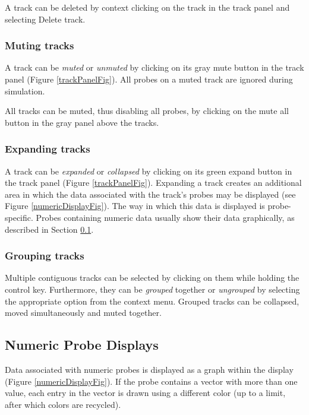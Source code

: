 \documentclass{article}
\begin{document}
A track can be deleted by context clicking on the track in
the track panel and selecting {\sf Delete track}.

\subsubsection{Muting tracks}

A track can be {\it muted} or {\it unmuted} by clicking on its gray mute button
in the track panel (Figure \ref{trackPanelFig}). All probes on a muted track are
ignored during simulation.

All tracks can be muted, thus disabling all probes, by clicking
on the mute all button in the gray panel above the tracks.

\subsubsection{Expanding tracks}

A track can be {\it expanded} or {\it collapsed} by clicking on its green
expand button in the track panel (Figure \ref{trackPanelFig}). Expanding a track
creates an additional area in which the data associated with the
track's probes may be displayed (see Figure \ref{numericDisplayFig}). The way
in which this data is displayed is probe-specific. Probes containing
numeric data usually show their data graphically, as described in
Section \ref{numericProbeDisplaysSec}.

\subsubsection{Grouping tracks}

Multiple contiguous tracks can be selected by clicking on them while
holding the control key.  Furthermore, they can be {\it grouped} together
or {\it ungrouped} by selecting the appropriate option from the context
menu.  Grouped tracks can be collapsed, moved simultaneously and
muted together.

\subsection{Numeric Probe Displays}
\label{numericProbeDisplaysSec}

Data associated with numeric probes is displayed as a graph within the
display (Figure \ref{numericDisplayFig}). If the probe contains a vector with
more than one value, each entry in the vector is drawn using a
different color (up to a limit, after which colors are recycled).
\end{document}
